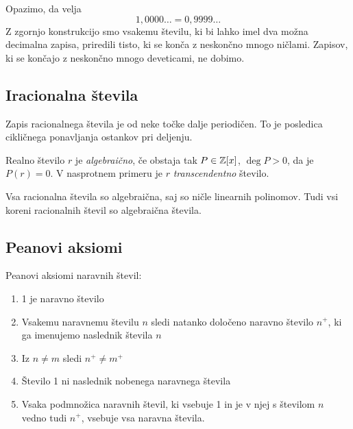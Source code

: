 \documentclass[12pt, a4paper]{article}
\begin{document}
Opazimo, da velja
\[
1,0000\ldots=0,9999\dots
\]
Z zgornjo konstrukcijo smo vsakemu številu, ki bi lahko imel dva možna decimalna zapisa, priredili tisto, ki se konča z neskončno mnogo ničlami. Zapisov, ki se končajo z neskončno mnogo deveticami, ne dobimo.

\newpage

\subsection{Iracionalna števila}

Zapis racionalnega števila je od neke točke dalje periodičen. To je posledica cikličnega ponavljanja ostankov pri deljenju.

\begin{definicija}
Realno število $r$ je \emph{algebraično}, če obstaja tak $P\in\mathbb{Z}[x]$, $\deg P>0$, da je $P(r)=0$. V nasprotnem primeru je $r$ \emph{transcendentno} število.
\end{definicija}

\begin{posledica}
Vsa racionalna števila so algebraična, saj so ničle linearnih polinomov. Tudi vsi koreni racionalnih števil so algebraična števila.
\end{posledica}

\newpage

\subsection{Peanovi aksiomi}

\begin{okvir}
\begin{definicija}
Peanovi aksiomi naravnih števil:

\begin{enumerate}[label=P\arabic*.]
\item 1 je naravno število
\item Vsakemu naravnemu številu $n$ sledi natanko določeno naravno število $n^+$, ki ga imenujemo naslednik števila $n$
\item Iz $n\ne m$ sledi $n^+\ne m^+$
\item Število 1 ni naslednik nobenega naravnega števila
\item Vsaka podmnožica naravnih števil, ki vsebuje 1 in je v njej s številom $n$ vedno tudi $n^+$, vsebuje vsa naravna števila.
\end{enumerate}
\end{definicija}
\end{okvir}
\end{document}
